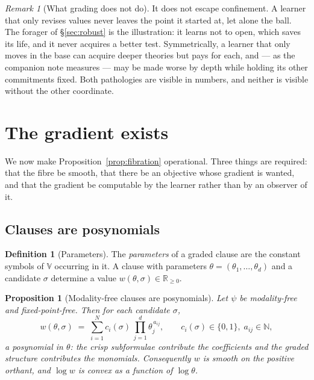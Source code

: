 \documentclass[11pt,a4paper]{article}
\theoremstyle{plain}
\newtheorem{proposition}[theorem]{Proposition}
\theoremstyle{definition}
\newtheorem{definition}[theorem]{Definition}
\theoremstyle{remark}
\newtheorem{remark}[theorem]{Remark}
\newcommand{\V}{\mathbb{V}}
\newcommand{\Rnn}{\mathbb{R}_{\geq 0}}
\newcommand{\Nat}{\mathbb{N}}
\begin{document}
\begin{remark}[What grading does not do]\label{rem:notescape}
It does not escape confinement. A learner that only revises values never leaves
the point it started at, let alone the ball. The forager of \S\ref{sec:robust} is
the illustration: it learns not to open, which saves its life, and it never
acquires a better test. Symmetrically, a learner that only moves in the base can
acquire deeper theories but pays for each, and --- as the companion note measures
--- may be made worse by depth while holding its other commitments fixed. Both
pathologies are visible in numbers, and neither is visible without the other
coordinate.
\end{remark}

\section{The gradient exists}\label{sec:gradient}

We now make Proposition~\ref{prop:fibration} operational. Three things are
required: that the fibre be smooth, that there be an objective whose gradient is
wanted, and that the gradient be computable by the learner rather than by an
observer of it.

\subsection{Clauses are posynomials}

\begin{definition}[Parameters]\label{def:params}
The \emph{parameters} of a graded clause are the constant symbols of $\V$
occurring in it. A clause with parameters $\theta = (\theta_1,\dots,\theta_d)$
and a candidate $\sigma$ determine a value $w(\theta,\sigma) \in \Rnn$.
\end{definition}

\begin{proposition}[Modality-free clauses are posynomials]\label{prop:posy}
Let $\psi$ be modality-free and fixed-point-free. Then for each candidate
$\sigma$,
\[
w(\theta,\sigma) \;=\; \sum_{i=1}^{N} c_i(\sigma)\,\prod_{j=1}^{d}
\theta_j^{\,a_{ij}},
\qquad c_i(\sigma)\in\{0,1\},\; a_{ij}\in\Nat ,
\]
a posynomial in $\theta$: the crisp subformulae contribute the coefficients and
the graded structure contributes the monomials. Consequently $w$ is smooth on the
positive orthant, and $\log w$ is convex as a function of $\log\theta$.
\end{proposition}
\end{document}
